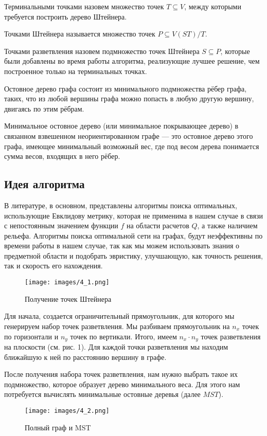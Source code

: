 Терминальными точками назовем множество точек  $T \subseteq V$, между которыми требуется построить дерево Штейнера.

Точками Штейнера называется множество точек $P \subseteq V(ST) / T$.

Точками разветвления назовем подмножество точек Штейнера $S \subseteq P$, которые были добавлены во время работы алгоритма, реализующие лучшее решение, чем построенное только на терминальных точках.

Остовное дерево графа состоит из минимального подмножества рёбер графа, таких, что из любой вершины графа можно попасть в любую другую вершину, двигаясь по этим рёбрам.

Минимальное остовное дерево (или минимальное покрывающее дерево) в связанном взвешенном неориентированном графе — это остовное дерево этого графа, имеющее минимальный возможный вес, где под весом дерева понимается сумма весов, входящих в него рёбер.

\subsection*{\Large{Идея алгоритма}}
В литературе, в основном, представлены алгоритмы поиска оптимальных, использующие Евклидову метрику, которая не применима в нашем случае в связи с непостоянным значением функции $f$ на области расчетов $Q$, а также наличием рельефа. Алгоритмы поиска оптимальной сети на графах, будут неэффективны по времени работы в нашем случае, так как мы можем использовать знания о предметной области и подобрать эвристику, улучшающую, как точность решения, так и скорость его нахождения.

\begin{figure}[H]
	\texttt{[image: images/4\_1.png]}
	\caption{Получение точек Штейнера}
\end{figure}
\vskip 4mm

Для начала, создается ограничительный прямоугольник, для которого мы генерируем набор точек разветвления. Мы разбиваем прямоугольник на $n_x$ точек по горизонтали и $n_y$ точек по вертикали. Итого, имеем $n_x \cdot n_y$  точек разветвления на плоскости (см. рис. 1). Для каждой точки разветвления мы находим ближайшую к ней по расстоянию вершину в графе.

После получения набора точек разветвления, нам нужно выбрать такое их подмножество, которое образует дерево минимального веса. Для этого нам потребуется вычислять минимальные остовные деревья (далее $MST$).
\begin{figure}[H]
	\texttt{[image: images/4\_2.png]}
	\caption{Полный граф и MST}
\end{figure}
\vskip 4mm

